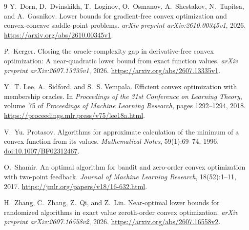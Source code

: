 \documentclass[11pt]{article}
\theoremstyle{plain}
\theoremstyle{definition}
\begin{document}
\begin{thebibliography}{9}
Y.~Dorn, D.~Dvinskikh, T.~Loginov, O.~Osmanov, A.~Shestakov,
N.~Tupitsa, and A.~Gasnikov.
\newblock Lower bounds for gradient-free convex optimization and convex-concave
  saddle-point problems.
\newblock \emph{arXiv preprint arXiv:2610.00345v1}, 2026.
\newblock \url{https://arxiv.org/abs/2610.00345v1}.

P.~Kerger.
\newblock Closing the oracle-complexity gap in derivative-free convex
  optimization: A near-quadratic lower bound from exact function values.
\newblock \emph{arXiv preprint arXiv:2607.13335v1}, 2026.
\newblock \url{https://arxiv.org/abs/2607.13335v1}.

Y.~T. Lee, A.~Sidford, and S.~S. Vempala.
\newblock Efficient convex optimization with membership oracles.
\newblock In \emph{Proceedings of the 31st Conference on Learning Theory},
  volume~75 of \emph{Proceedings of Machine Learning Research},
  pages 1292--1294, 2018.
\newblock \url{https://proceedings.mlr.press/v75/lee18a.html}.

V.~Yu. Protasov.
\newblock Algorithms for approximate calculation of the minimum of a convex
  function from its values.
\newblock \emph{Mathematical Notes}, 59(1):69--74, 1996.
\newblock \href{https://doi.org/10.1007/BF02312467}{doi:10.1007/BF02312467}.

O.~Shamir.
\newblock An optimal algorithm for bandit and zero-order convex optimization
  with two-point feedback.
\newblock \emph{Journal of Machine Learning Research}, 18(52):1--11, 2017.
\newblock \url{https://jmlr.org/papers/v18/16-632.html}.

H.~Zhang, C.~Zhang, Z.~Qi, and Z.~Lin.
\newblock Near-optimal lower bounds for randomized algorithms in exact value
  zeroth-order convex optimization.
\newblock \emph{arXiv preprint arXiv:2607.16558v2}, 2026.
\newblock \url{https://arxiv.org/abs/2607.16558v2}.

\end{thebibliography}
\end{document}

